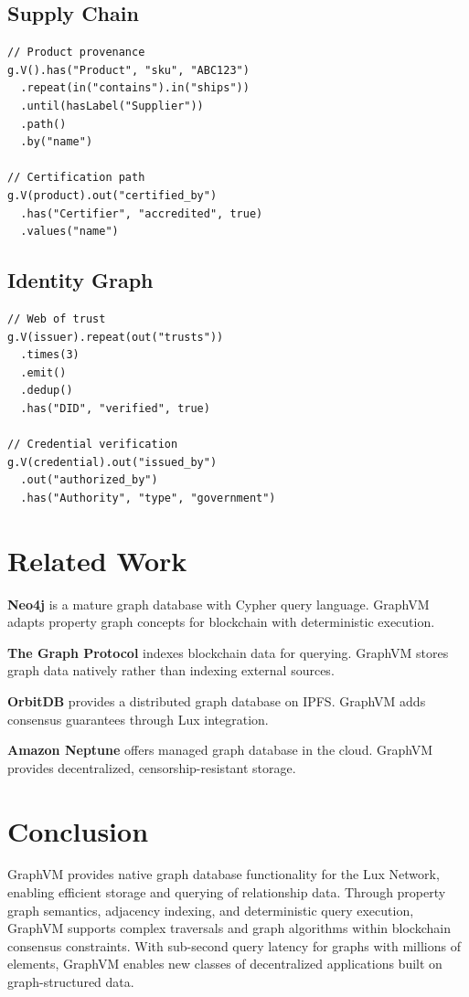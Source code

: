 \documentclass[11pt,a4paper]{article}
\theoremstyle{definition}
\begin{document}
\subsection{Supply Chain}

\begin{lstlisting}
// Product provenance
g.V().has("Product", "sku", "ABC123")
  .repeat(in("contains").in("ships"))
  .until(hasLabel("Supplier"))
  .path()
  .by("name")

// Certification path
g.V(product).out("certified_by")
  .has("Certifier", "accredited", true)
  .values("name")
\end{lstlisting}

\subsection{Identity Graph}

\begin{lstlisting}
// Web of trust
g.V(issuer).repeat(out("trusts"))
  .times(3)
  .emit()
  .dedup()
  .has("DID", "verified", true)

// Credential verification
g.V(credential).out("issued_by")
  .out("authorized_by")
  .has("Authority", "type", "government")
\end{lstlisting}

\section{Related Work}

\textbf{Neo4j} is a mature graph database with Cypher query language. GraphVM adapts property graph concepts for blockchain with deterministic execution.

\textbf{The Graph Protocol} indexes blockchain data for querying. GraphVM stores graph data natively rather than indexing external sources.

\textbf{OrbitDB} provides a distributed graph database on IPFS. GraphVM adds consensus guarantees through Lux integration.

\textbf{Amazon Neptune} offers managed graph database in the cloud. GraphVM provides decentralized, censorship-resistant storage.

\section{Conclusion}

GraphVM provides native graph database functionality for the Lux Network, enabling efficient storage and querying of relationship data. Through property graph semantics, adjacency indexing, and deterministic query execution, GraphVM supports complex traversals and graph algorithms within blockchain consensus constraints. With sub-second query latency for graphs with millions of elements, GraphVM enables new classes of decentralized applications built on graph-structured data.
\end{document}

